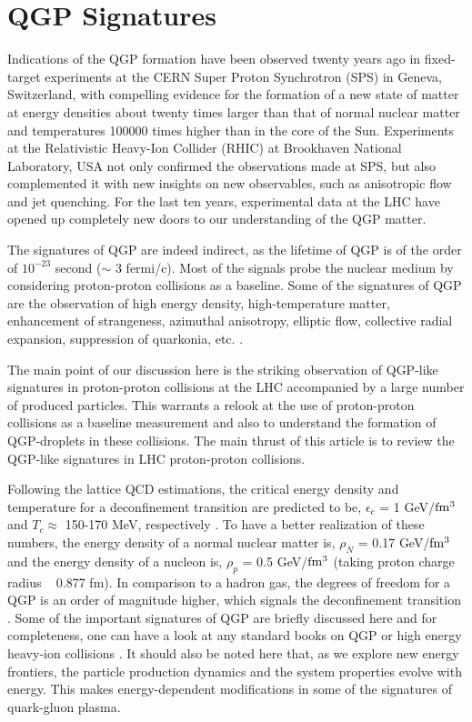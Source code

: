 \documentclass[showpacs,showkeys,aps,twocolumn]{revtex4}
\newcommand\+{\dagger}
\begin{document}
\section{QGP Signatures}
\label{section3}
Indications of the QGP formation have been observed twenty years ago in fixed-target experiments at the CERN Super Proton Synchrotron (SPS) in Geneva, Switzerland, with compelling evidence for the formation of a new state of matter at energy densities about twenty times larger than that of normal nuclear matter and temperatures 100000 times higher than in the core of the Sun. Experiments at the Relativistic Heavy-Ion Collider (RHIC) at Brookhaven National Laboratory, USA not only confirmed the observations made at SPS, but also complemented it with new insights on new observables, such as anisotropic flow and jet quenching. For the last ten years, experimental data at the LHC have opened up completely new doors to our understanding of the QGP matter.

The signatures of QGP are indeed indirect, as the lifetime of QGP is of the order of $10^{-23}$ second ($\sim$ 3 fermi/c). Most of the signals probe the nuclear medium by considering proton-proton collisions as a baseline. Some of the signatures of QGP are the observation of high energy density, high-temperature matter, enhancement of strangeness, azimuthal anisotropy, elliptic flow, collective radial expansion, suppression of quarkonia,  etc. \cite{Ref4,Ref5}. 

The main point of our discussion here is the striking observation of QGP-like signatures in proton-proton collisions at the LHC accompanied by a large number of produced particles. This warrants a relook at the use of proton-proton collisions as a baseline measurement and also to understand the formation of QGP-droplets in these collisions. The main thrust of this article is to review the QGP-like signatures in LHC proton-proton collisions.

Following the lattice QCD estimations, the critical energy density and temperature for a deconfinement transition are predicted to be, $\epsilon_c$ = 1 GeV/$\rm fm^3$ and $T_c \approx$  150-170 MeV, respectively \cite{Ref5}. To have a better realization of these numbers, the energy density of a normal nuclear matter is, $\rho_N$ = 0.17 GeV/$\rm fm^3$ and the energy density of a nucleon is, $\rho_p$ = 0.5 GeV/$\rm fm^3$ (taking proton charge radius ~ 0.877 fm). In comparison to a hadron gas, the degrees of freedom for a QGP is an order of magnitude higher, which signals the deconfinement transition \cite{Ref4}. Some of the important signatures of QGP are briefly discussed here and for completeness, one can have a look at any standard books on QGP or high energy heavy-ion collisions \cite{Ref6,Ref7}. It should also be noted here that, as we explore new energy frontiers, the particle production dynamics and the system properties evolve with energy. This makes energy-dependent modifications in some of the signatures of quark-gluon plasma.
\end{document}

